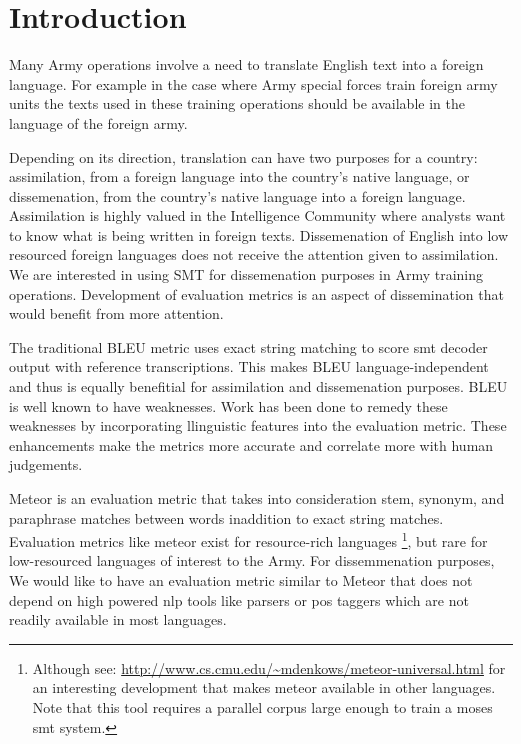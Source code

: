\section{Introduction}
\label{sec:intro}

Many Army operations involve a need to translate English text into a
foreign language. For example in the case where Army special forces
train foreign army units the texts used in these training operations
should be available in the language of the foreign army.

Depending on its direction, translation can have two purposes for a
country: assimilation, from a foreign language into the country's
native language, or dissemenation, from the country's native language
into a foreign language. Assimilation is highly valued in the
Intelligence Community where analysts want to know what is being
written in foreign texts. Dissemenation of English into low resourced
foreign languages does not receive the attention given to
assimilation. We are interested in using SMT for
dissemenation purposes in Army training operations. Development of
evaluation metrics is an aspect of dissemination that would benefit
from more attention.

The traditional BLEU\cite{BLEU} metric uses exact string matching to score smt
decoder output with reference transcriptions. This makes BLEU
language-independent and thus is equally benefitial for assimilation
and dissemenation purposes. BLEU is well known to have
weaknesses\cite{Callison-Burch2006EACL}. Work has been done to remedy these weaknesses by
incorporating llinguistic features into the evaluation metric. These
enhancements make the metrics more accurate and correlate more with
human judgements.

Meteor\cite{banerjee-lavie2005MTSumm} is an evaluation metric that takes into consideration stem, synonym, and paraphrase matches between words inaddition to exact string matches. Evaluation metrics like meteor exist for resource-rich languages \footnote{Although see: \url{http://www.cs.cmu.edu/~mdenkows/meteor-universal.html} for an interesting development that makes meteor available in other languages. Note that this tool  requires a parallel corpus large enough to train a moses smt system.}, but rare for low-resourced languages of interest to the Army. For dissemmenation purposes, We would like to have an evaluation metric similar to Meteor that does not depend on high powered nlp tools like parsers or pos taggers which are not readily available in most languages.

